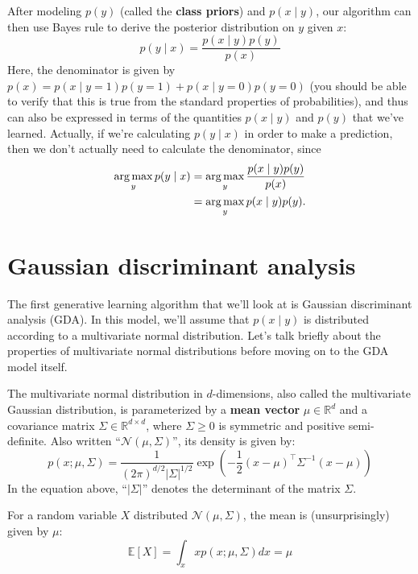 After modeling $p(y)$ (called the \textbf{class priors}) and $p(x \mid y)$, our algorithm
can then use Bayes rule to derive the posterior distribution on $y$ given $x$:
\begin{equation}
    p(y \mid x) = \frac{p(x \mid y)p(y)}{p(x)}    
\end{equation}
Here, the denominator is given by $p(x) = p(x \mid y = 1)p(y = 1) + p(x \mid y =
0)p(y = 0)$ (you should be able to verify that this is true from the standard
properties of probabilities), and thus can also be expressed in terms of the
quantities $p(x \mid y)$ and $p(y)$ that we've learned. Actually, if we're calculating %
$p(y \mid x)$ in order to make a prediction, then we don't actually need to calculate
the denominator, since
\begin{align*}
    \argmax_y p(y \mid x) &= \argmax_y \frac{p(x \mid y)p(y)}{p(x)}\\
                          &= \argmax_y p(x \mid y)p(y).
\end{align*}

{\let\cleardoublepage\relax \chapter{Gaussian discriminant analysis}}
The first generative learning algorithm that we'll look at is Gaussian discriminant
analysis (GDA). In this model, we'll assume that $p(x \mid y)$ is distributed
according to a multivariate normal distribution. Let's talk briefly about the
properties of multivariate normal distributions before moving on to the GDA
model itself.

The multivariate normal distribution in $d$-dimensions, also called the multivariate
Gaussian distribution, is parameterized by a \textbf{mean vector} $\mu \in \mathbb{R}^d$
and a covariance matrix $\Sigma \in \mathbb{R}^{d \times d}$, where $\Sigma \ge 0$ is symmetric and positive
semi-definite. Also written ``$\mathcal N(\mu,\Sigma)$'', its density is given by:
\begin{equation}
p(x; \mu,\Sigma) = \frac{1}{(2\pi)^{d/2} |\Sigma|^{1/2}} \exp\left( -\frac{1}{2}(x - \mu)^\top \Sigma^{-1}(x - \mu) \right)
\end{equation}
In the equation above, ``$|\Sigma|$'' denotes the determinant of the matrix $\Sigma$.

For a random variable $X$ distributed $\mathcal N(\mu,\Sigma)$, the mean is (unsurprisingly)
given by $\mu$:
\begin{equation}
    \mathbb{E}[X] = \int_x x p(x; \mu, \Sigma) dx = \mu
\end{equation}

